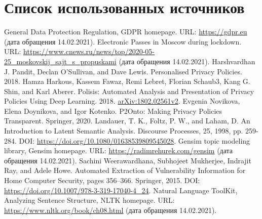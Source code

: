\documentclass[../main]{subfiles}
\begin{document}
\newpage
{}
\section*{Список использованных источников}

\begin{biblenum}
     General Data Protection Regulation, GDPR homepage. URL: \url{https://gdpr.eu} (дата обращения 14.02.2021).
     Electronic Passes in Moscow during lockdown. URL: \url{https://www.cnews.ru/news/top/2020-05-25_moskovskij_sajt_s_propuskami} (дата обращения 14.02.2021).
     Harshvardhan J. Pandit, Declan O’Sullivan, and Dave Lewis. Personalised Privacy Policies. 2018.
     Hamza Harkous, Kassem Fawaz, Remi Lebret, Florian Schaub3, Kang G. Shin, and Karl Aberer. Polisis: Automated Analysis and Presentation of Privacy Policies Using Deep Learning. 2018. \href{https://arxiv.org/abs/1802.02561v2}{arXiv:1802.02561v2}.
     Evgenia Novikova, Elena Doynikova, and Igor Kotenko. P2Onto: Making Privacy Policies Transparent. Springer, 2020.
     Landauer, T. K., Foltz, P. W., and Laham, D. An Introduction to Latent Semantic Analysis. Discourse Processes, 25, 1998, pp. 259-284. DOI: \url{https://doi.org/10.1080/01638539809545028}.
     Gensim topic modeling library, Gensim homepage. URL: \url{https://radimrehurek.com/gensim} (дата обращения 14.02.2021).
     Sachini Weerawardhana, Subhojeet Mukherjee, Indrajit Ray, and Adele Howe. Automated Extraction of Vulnerability Information for Home Computer Security, pages 356–366. Springer, 2015. DOI: \url{https://doi.org/10.1007/978-3-319-17040-4_24}.
     Natural Language ToolKit, Analyzing Sentence Structure, NLTK home\-page. URL: \url{https://www.nltk.org/book/ch08.html} (дата обращения 14.02.2021).
\end{biblenum}
\end{document}
